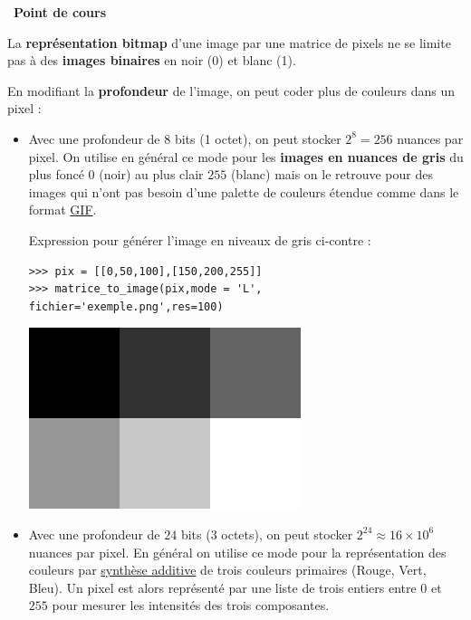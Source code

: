 \documentclass[a4paper, french, 12pt]{article}
\newcounter{cours}
\newenvironment{cours}[1]
{\par \medskip   \addtocounter{cours}{1} \noindent  
\begin{bclogo}[arrondi =0.1,  ombre = true, barre=none, logo=\bcbook, marge=4]{~\textbf{Point de cours} \textbf{\thecours} {\itshape #1} }  \par}
{
\end{bclogo}
 \par \bigskip }
\begin{document}
\begin{cours}{}
La \textbf{représentation bitmap}   d'une image par une matrice de pixels ne se limite pas à des \textbf{images binaires} en noir (0)  et blanc (1). 

En modifiant la \textbf{profondeur} de l'image, on peut coder plus de couleurs dans un pixel :

\begin{itemize}[label=]
	\item Avec une profondeur de $8$ bits (1 octet), on peut stocker $2^{8}=256$ nuances par pixel. On utilise en général ce mode pour les \textbf{images en nuances de gris}  du plus foncé $0$ (noir) au plus clair $255$ (blanc) mais on le retrouve  pour des images  qui n'ont pas besoin d'une palette de couleurs  étendue  comme dans le format \href{https://fr.wikipedia.org/wiki/Graphics_Interchange_Format}{GIF}.
	
\begin{minipage}{0.65\linewidth}
Expression pour générer l'image en niveaux de gris ci-contre :

\begin{lstlisting}[style=compil]
>>> pix = [[0,50,100],[150,200,255]]
>>> matrice_to_image(pix,mode = 'L', 
fichier='exemple.png',res=100)
\end{lstlisting}
\end{minipage}
\hfill
\begin{minipage}{0.3\linewidth}
\begin{center}
\includegraphics[scale=0.5]{images/exemple_grayscale.png}
\end{center}
\end{minipage}

	\item Avec une profondeur de $24$ bits (3 octets), on peut stocker $2^{24} \approx 16 \times 10^{6}$ nuances par pixel. En général on utilise ce mode pour la représentation des couleurs par \href{https://fr.wikipedia.org/wiki/Synth\%C3\%A8se_additive}{synthèse additive} de trois couleurs primaires (Rouge, Vert, Bleu). Un pixel est alors représenté par une liste de trois entiers entre $0$ et $255$ pour mesurer les intensités des trois composantes.
	

\end{itemize}
\end{cours}
\end{document}
